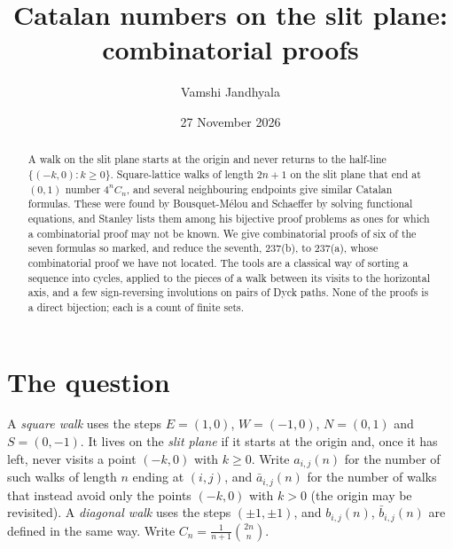 \documentclass[11pt]{amsart}
\title{Catalan numbers on the slit plane: combinatorial proofs}
\author{Vamshi Jandhyala}
\date{27 November 2026}
\theoremstyle{definition}
\theoremstyle{remark}
\newcommand{\abar}{\bar a}
\newcommand{\bbar}{\bar b}
\begin{document}
\begin{abstract}
A walk on the slit plane starts at the origin and never returns to the half-line $\{(-k,0):k\ge0\}$. Square-lattice
walks of length $2n+1$ on the slit plane that end at $(0,1)$ number $4^nC_n$, and several neighbouring endpoints give
similar Catalan formulas. These were found by Bousquet-M\'elou and Schaeffer by solving functional equations, and
Stanley lists them among his bijective proof problems as ones for which a combinatorial proof may not be known. We give
combinatorial proofs of six of the seven formulas so marked, and reduce the seventh, 237(b), to 237(a), whose
combinatorial proof we have not located. The tools are a
classical way of sorting a sequence into cycles, applied to the pieces of a walk between its visits to the
horizontal axis, and a few sign-reversing involutions on pairs of Dyck paths. None of the proofs is a direct
bijection; each is a count of finite sets.
\end{abstract}
\maketitle

\section{The question}

A \emph{square walk} uses the steps $E=(1,0)$, $W=(-1,0)$, $N=(0,1)$ and $S=(0,-1)$. It lives on the \emph{slit plane}
if it starts at the origin and, once it has left, never visits a point $(-k,0)$ with $k\ge0$. Write $a_{i,j}(n)$ for the
number of such walks of length $n$ ending at $(i,j)$, and $\abar_{i,j}(n)$ for the number of walks that instead avoid
only the points $(-k,0)$ with $k>0$ (the origin may be revisited). A \emph{diagonal walk} uses the steps $(\pm1,\pm1)$,
and $b_{i,j}(n)$, $\bbar_{i,j}(n)$ are defined in the same way. Write $C_n=\frac1{n+1}\binom{2n}n$.
\end{document}
